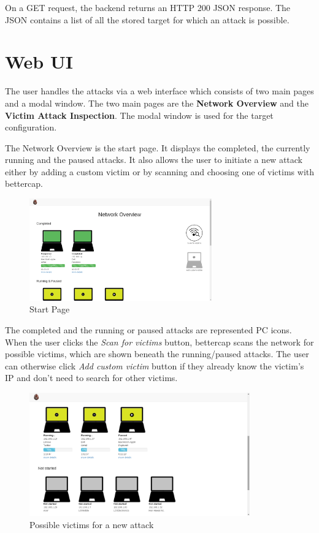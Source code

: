 On a GET request, the backend returns an HTTP 200 JSON response. The JSON contains 
a list of all the stored target for which an attack is possible.



\section{Web UI}                                                                                                          

The user handles the attacks via a web interface which consists 
of two main pages and a modal window. The two main pages are the
\textbf{Network Overview} and the \textbf{Victim Attack Inspection}. 
The modal window is used for the target configuration.

The Network Overview is the start page. It displays the completed,
 the currently running and the paused attacks. It also allows the user 
to initiate a new attack either by adding a custom victim or by scanning 
and choosing one of victims with bettercap.

\begin{figure}[H] \caption{Start Page} \centering
\includegraphics[width=0.7\textwidth]{diagrams/startPage.png}
\end{figure}

The completed and the running or paused attacks are represented PC icons. 
When the user clicks the \textit{Scan for victims} button, bettercap scans 
the network for possible victims, which are shown beneath the running/paused attacks.
The user can otherwise click \textit{Add custom victim} 
button if they already know the victim’s IP and don’t need to search for other victims.

\begin{figure}[H] \centering \includegraphics[width=95mm]{diagrams/notstarted.png}
\caption{Possible victims for a new attack} \end{figure}

